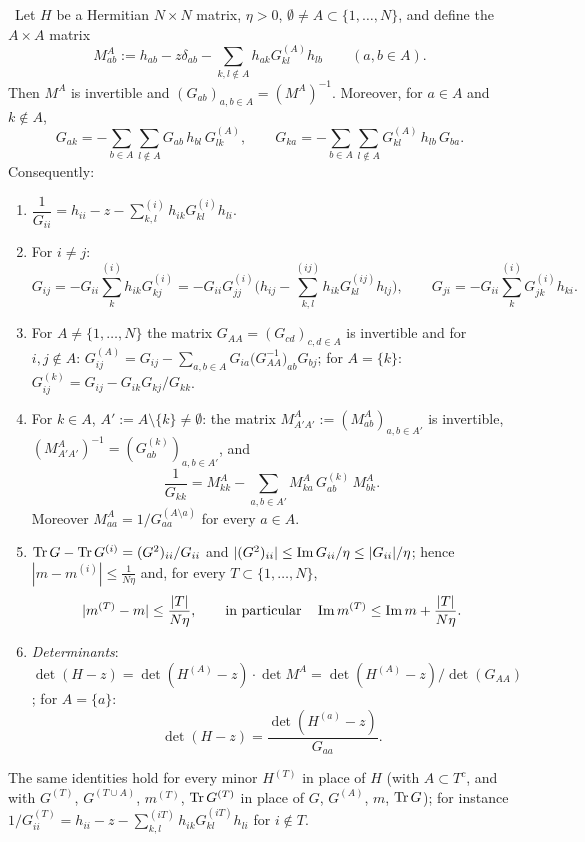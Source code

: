 \begin{lemma}\label{lem:schur} \infra\
Let $H$ be a Hermitian $N\times N$ matrix, $\eta>0$, $\emptyset\ne A\subset\{1,\dots,N\}$, and define the $A\times A$ matrix
\begin{equation}\label{eq:MA}
 M^A_{ab}:=h_{ab}-z\delta_{ab}-\sum_{k,l\notin A}h_{ak}G^{(A)}_{kl}h_{lb}\qquad(a,b\in A).
\end{equation}
Then $M^A$ is invertible and $(G_{ab})_{a,b\in A}=(M^A)^{-1}$. Moreover, for $a\in A$ and $k\notin A$,
\[
 G_{ak}=-\sum_{b\in A}\sum_{l\notin A}G_{ab}\,h_{bl}\,G^{(A)}_{lk},\qquad G_{ka}=-\sum_{b\in A}\sum_{l\notin A}G^{(A)}_{kl}\,h_{lb}\,G_{ba}.
\]
Consequently:
\begin{enumerate}[label=\textup{(I\arabic*)},leftmargin=2.6em,itemsep=1pt]
\item $\dfrac1{G_{ii}}=h_{ii}-z-\sum^{(i)}_{k,l}h_{ik}G^{(i)}_{kl}h_{li}$.
\item For $i\ne j$:
\[
 G_{ij}=-G_{ii}\sum^{(i)}_kh_{ik}G^{(i)}_{kj}=-G_{ii}G^{(i)}_{jj}\Big(h_{ij}-\sum^{(ij)}_{k,l}h_{ik}G^{(ij)}_{kl}h_{lj}\Big),
 \qquad G_{ji}=-G_{ii}\sum^{(i)}_kG^{(i)}_{jk}h_{ki}.
\]
\item For $A\ne\{1,\dots,N\}$ the matrix $G_{AA}=(G_{cd})_{c,d\in A}$ is invertible and for $i,j\notin A$:
$G^{(A)}_{ij}=G_{ij}-\sum_{a,b\in A}G_{ia}\big(G_{AA}^{-1}\big)_{ab}G_{bj}$; for $A=\{k\}$: $G^{(k)}_{ij}=G_{ij}-G_{ik}G_{kj}/G_{kk}$.
\item For $k\in A$, $A':=A\setminus\{k\}\ne\emptyset$: the matrix $M^A_{A'A'}:=(M^A_{ab})_{a,b\in A'}$ is invertible, $(M^A_{A'A'})^{-1}=(G^{(k)}_{ab})_{a,b\in A'}$, and
\begin{equation}\label{eq:1overG}
 \frac1{G_{kk}}=M^A_{kk}-\sum_{a,b\in A'}M^A_{ka}\,G^{(k)}_{ab}\,M^A_{bk}.
\end{equation}
Moreover $M^A_{aa}=1/G^{(A\setminus a)}_{aa}$ for every $a\in A$.
\item $\operatorname{Tr} G-\operatorname{Tr} G^{(i)}=(G^2)_{ii}/G_{ii}$ and $|(G^2)_{ii}|\le\operatorname{Im} G_{ii}/\eta\le|G_{ii}|/\eta$; hence $|m-m^{(i)}|\le\frac1{N\eta}$ and, for every $T\subset\{1,\dots,N\}$,
\[
 |m^{(T)}-m|\le\frac{|T|}{N\eta},\qquad\text{in particular}\quad\operatorname{Im} m^{(T)}\le\operatorname{Im} m+\frac{|T|}{N\eta}.
\]
\item \emph{Determinants}: $\det(H-z)=\det(H^{(A)}-z)\cdot\det M^A=\det(H^{(A)}-z)/\det(G_{AA})$; for $A=\{a\}$:
\[
 \det(H-z)=\frac{\det(H^{(a)}-z)}{G_{aa}} .
\]
\end{enumerate}
The same identities hold for every minor $H^{(T)}$ in place of $H$ (with $A\subset T^c$, and with $G^{(T)}$, $G^{(T\cup A)}$, $m^{(T)}$, $\operatorname{Tr} G^{(T)}$ in place of $G$, $G^{(A)}$, $m$, $\operatorname{Tr} G$);
for instance $1/G^{(T)}_{ii}=h_{ii}-z-\sum^{(iT)}_{k,l}h_{ik}G^{(iT)}_{kl}h_{li}$ for $i\notin T$.
\end{lemma}
